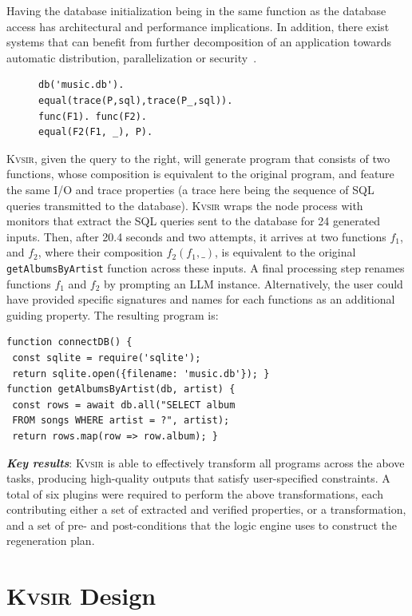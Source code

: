 \documentclass[noacm,sigplan,review]{acmart}
\newcommand{\sys}{{\scshape Kv{\textalpha}sir}\xspace}
\newcommand{\heading}[1]{\vspace{2pt}\noindent\textbf{\emph{#1}}:\enspace}
\newcommand{\ttt}[1]{\texttt{#1}\xspace}
\begin{document}
Having the database initialization being in the same function as 
the database access has architectural and performance implications.
In addition, there exist systems that can benefit from further decomposition
of an application towards automatic distribution, parallelization or security~\cite{Towards_Modern_Ghemaw_2023, vasilakis2019ignis, vasilakis2018breakapp}.
\begin{figure}
  \vspace{-10pt}
  \begin{verbatim}
db('music.db').
equal(trace(P,sql),trace(P_,sql)).
func(F1). func(F2).
equal(F2(F1, _), P).
\end{verbatim}
\end{figure}
\sys, given the query to the right, will 
generate program that consists of two functions,
whose composition is equivalent to the original program, and feature 
the same I/O and trace properties (a trace here being the sequence of SQL 
queries transmitted to the database).
\sys wraps the node process with monitors that extract the SQL queries 
sent to the database for 24 generated inputs.
Then, after 20.4 seconds and two attempts, it arrives at two functions $f_1$, and 
$f_2$, where their composition $f_2(f_1, \_)$, is equivalent to the original \ttt{getAlbumsByArtist} function across these inputs.
A final processing step renames functions $f_1$ and $f_2$ by prompting an LLM instance.
Alternatively, the user could have provided specific signatures and names for each 
functions as an additional guiding property.
The resulting program is:
\begin{verbatim}
function connectDB() {
 const sqlite = require('sqlite');
 return sqlite.open({filename: 'music.db'}); }
function getAlbumsByArtist(db, artist) {
 const rows = await db.all("SELECT album
 FROM songs WHERE artist = ?", artist);
 return rows.map(row => row.album); }
\end{verbatim}

\heading{Key results}
\sys is able to effectively transform all programs across the above tasks,
producing high-quality outputs that satisfy user-specified constraints. A total
of six plugins were required to perform the above transformations, each
contributing either a set of extracted and verified properties, or a
transformation, and a set of pre- and post-conditions that the logic engine
uses to construct the regeneration plan.

\section{\sys Design}
\label{sec:design}
\end{document}
